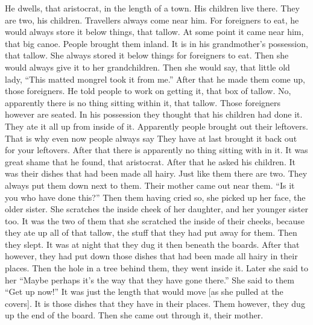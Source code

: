 \begin{pairs}
\begin{Rightside}
\beginnumbering
\pstart
\noindent
{}He dwells, that aristocrat, in the length of a town.
His children live there.
They are two, his children.
Travellers always come near him.
For foreigners to eat, he would always store it below things, that tallow.
At some point it came near him, that big canoe.
People brought them inland.
It is in his grandmother’s possession, that tallow.
She always stored it below things for foreigners to eat.
Then she would always give it to her grandchildren.
Then she would say, that little old lady,
\qqk{}“This matted mongrel took it from me.”
\pend
\pstart
{}After that he made them come up, those foreigners.
He told people to work on getting it, that box of tallow.
No, apparently there is no thing sitting within it, that tallow.
Those foreigners however are seated.
In his possession they thought that his children had done it.
They ate it all up from inside of it.
Apparently people brought out their leftovers.
That is why even now people always say
They have at last brought it back out for your leftovers.
After that there is apparently no thing sitting with in it.
It was great shame that he found, that aristocrat.
After that he asked his children.
It was their dishes that had been made all hairy.
Just like them there are two.
They always put them down next to them.
Their mother came out near them.
\qqk{}“Is it you who have done this?”
Then them having cried so, she picked up her face, the older sister.
She scratches the inside cheek of her daughter, and her younger sister too.
It was the two of them that she scratched the inside of their cheeks, because they ate up all of that tallow, the stuff that they had put away for them.
Then they slept.
It was at night that they dug it then beneath the boards.
After that however, they had put down those dishes that had been made all hairy in their places.
Then the hole in a tree behind them, they went inside it.
\pend
\pstart
{}Later she said to her
\qqk{}“Maybe perhaps it’s the way that they have gone there.”
She said to them
\qqk{}“Get up now!”
It was just the length that would move [as she pulled at the covers].
It is those dishes that they have in their places.
Them however, they dug up the end of the board.
Then she came out through it, their mother.

\end{Rightside}
\end{pairs}
